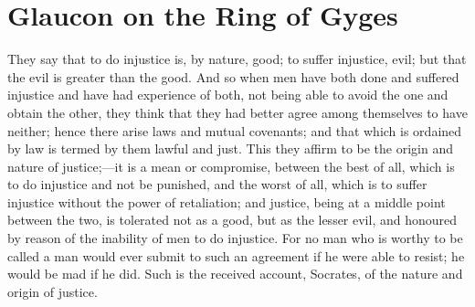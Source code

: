 
\author{Plato}
\chapter{Glaucon on the Ring of Gyges}


They say that to do injustice is, by nature, good; to suffer
injustice, evil; but that the evil is greater than the good. And so
when men have both done and suffered injustice and have had experience
of both, not being able to avoid the one and obtain the other, they
think that they had better agree among themselves to have neither;
hence there arise laws and mutual covenants; and that which is
ordained by law is termed by them lawful and just. This they affirm to
be the origin and nature of jus\-tice;---it is a mean or compromise,
between the best of all, which is to do injustice and not be punished,
and the worst of all, which is to suffer injustice without the power
of retaliation; and justice, being at a middle point between the two,
is tolerated not as a good, but as the lesser evil, and honoured by
reason of the inability of men to do injustice. For no man who is
worthy to be called a man would ever submit to such an agreement if he
were able to resist; he would be mad if he did. Such is the received
account, Socrates, of the nature and origin of justice.


